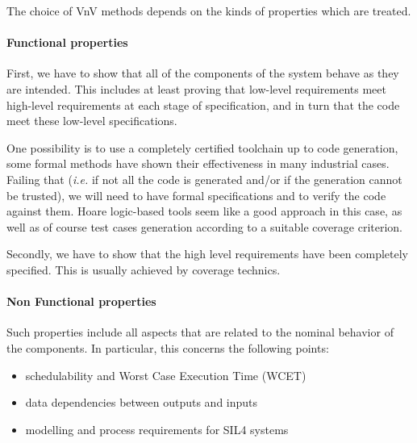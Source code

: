 \documentclass{template/openetcs_article}
\begin{document}
The choice of VnV methods depends on the kinds of properties which are treated.




\paragraph{Functional properties}

First, we have to show that all of the components of the system behave
as they are intended. This includes at least proving that low-level requirements meet
high-level requirements at each stage of specification, and in turn that the code meet these low-level
specifications. 

One possibility is to use a completely certified toolchain up
to code generation, some formal methods have shown their effectiveness in many industrial cases. Failing that ({\it i.e.} if not all the code is generated
and/or if the generation cannot be trusted), we will need to have formal
specifications and to verify the code against them. Hoare logic-based tools
seem like a good approach in this case, as well as of course test cases
generation according to a suitable coverage criterion.

Secondly, we have to  show that the high level requirements have been completely specified. This is usually  achieved by coverage technics. 

\paragraph{Non Functional properties}

Such properties include all aspects that are related to the nominal behavior
of the components. In particular, this concerns the following points:
\begin{itemize}
\item schedulability and Worst Case Execution Time (WCET)
\item data dependencies between outputs and inputs
\item modelling and process requirements for SIL4 systems
\end{itemize}
\end{document}
